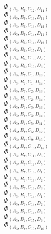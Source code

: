 \documentclass[14pt]{article}
\begin{document}
    $\Phi_{({A}_{3}, {B}_{6}, {C}_{12}, {D}_{14})}$ \\ 
    $\Phi_{({A}_{3}, {B}_{6}, {C}_{13}, {D}_{11})}$ \\ 
    $\Phi_{({A}_{3}, {B}_{6}, {C}_{13}, {D}_{12})}$ \\ 
    $\Phi_{({A}_{3}, {B}_{6}, {C}_{14}, {D}_{11})}$ \\ 
    $\Phi_{({A}_{3}, {B}_{6}, {C}_{14}, {D}_{12})}$ \\ 
    $\Phi_{({A}_{3}, {B}_{6}, {C}_{15}, {D}_{1})}$ \\ 
    $\Phi_{({A}_{3}, {B}_{6}, {C}_{15}, {D}_{2})}$ \\ 
    $\Phi_{({A}_{3}, {B}_{6}, {C}_{15}, {D}_{3})}$ \\ 
    $\Phi_{({A}_{3}, {B}_{7}, {C}_{1}, {D}_{13})}$ \\ 
    $\Phi_{({A}_{3}, {B}_{7}, {C}_{1}, {D}_{14})}$ \\ 
    $\Phi_{({A}_{3}, {B}_{7}, {C}_{2}, {D}_{13})}$ \\ 
    $\Phi_{({A}_{3}, {B}_{7}, {C}_{2}, {D}_{14})}$ \\ 
    $\Phi_{({A}_{3}, {B}_{7}, {C}_{3}, {D}_{13})}$ \\ 
    $\Phi_{({A}_{3}, {B}_{7}, {C}_{3}, {D}_{14})}$ \\ 
    $\Phi_{({A}_{3}, {B}_{7}, {C}_{5}, {D}_{11})}$ \\ 
    $\Phi_{({A}_{3}, {B}_{7}, {C}_{5}, {D}_{12})}$ \\ 
    $\Phi_{({A}_{3}, {B}_{7}, {C}_{9}, {D}_{15})}$ \\ 
    $\Phi_{({A}_{3}, {B}_{7}, {C}_{10}, {D}_{15})}$ \\ 
    $\Phi_{({A}_{3}, {B}_{7}, {C}_{11}, {D}_{5})}$ \\ 
    $\Phi_{({A}_{3}, {B}_{7}, {C}_{12}, {D}_{5})}$ \\ 
    $\Phi_{({A}_{3}, {B}_{7}, {C}_{13}, {D}_{1})}$ \\ 
    $\Phi_{({A}_{3}, {B}_{7}, {C}_{13}, {D}_{2})}$ \\ 
    $\Phi_{({A}_{3}, {B}_{7}, {C}_{13}, {D}_{3})}$ \\ 
    $\Phi_{({A}_{3}, {B}_{7}, {C}_{14}, {D}_{1})}$ \\ 
    $\Phi_{({A}_{3}, {B}_{7}, {C}_{14}, {D}_{2})}$ \\ 
    $\Phi_{({A}_{3}, {B}_{7}, {C}_{14}, {D}_{3})}$ \\ 
    $\Phi_{({A}_{3}, {B}_{7}, {C}_{15}, {D}_{9})}$ \\ 
    $\Phi_{({A}_{3}, {B}_{7}, {C}_{15}, {D}_{10})}$ \\ 
\end{document}
